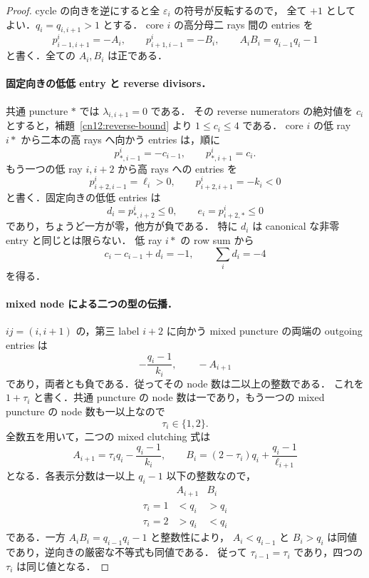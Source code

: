 \begin{proof}
cycle の向きを逆にすると全 $\varepsilon_i$ の符号が反転するので，
全て $+1$ としてよい．$q_i=q_{i,i+1}>1$ とする．
core $i$ の高分母二 rays 間の entries を
\[
 p^i_{i-1,i+1}=-A_i,\qquad
 p^i_{i+1,i-1}=-B_i,
 \qquad A_iB_i=q_{i-1}q_i-1
\]
と書く．全ての $A_i,B_i$ は正である．

\paragraph{固定向きの低低 entry と reverse divisors．}
共通 puncture $*$ では $\lambda_{i,i+1}=0$ である．
その reverse numerators の絶対値を $c_i$ とすると，補題~\ref{cn12:reverse-bound} より
$1\leq c_i\leq4$ である．
core $i$ の低 ray $i*$ から二本の高 rays へ向かう entries は，順に
\[
 p^i_{*,i-1}=-c_{i-1},\qquad p^i_{*,i+1}=c_i.
\]
もう一つの低 ray $i,i+2$ から高 rays への entries を
\[
 p^i_{i+2,i-1}=\ell_i>0,\qquad
 p^i_{i+2,i+1}=-k_i<0
\]
と書く．固定向きの低低 entries は
\[
 d_i=p^i_{*,i+2}\leq0,\qquad e_i=p^i_{i+2,*}\leq0
\]
であり，ちょうど一方が零，他方が負である．
特に $d_i$ は canonical な非零 entry と同じとは限らない．
低 ray $i*$ の row sum から
\begin{equation}\label{cq12:fixed-row}
 c_i-c_{i-1}+d_i=-1,
 \qquad \sum_i d_i=-4
\end{equation}
を得る．

\paragraph{mixed node による二つの型の伝播．}
$ij=(i,i+1)$ の，第三 label $i+2$ に向かう mixed puncture の両端の outgoing entries は
\[
 -\frac{q_i-1}{k_i},\qquad -A_{i+1}
\]
であり，両者とも負である．従ってその node 数は二以上の整数である．
これを $1+\tau_i$ と書く．共通 puncture の node 数は一であり，もう一つの mixed puncture の node 数も一以上なので
\[
 \tau_i\in\{1,2\}.
\]
全数五を用いて，二つの mixed clutching 式は
\begin{equation}\label{cq12:tau-equations}
 A_{i+1}=\tau_iq_i-\frac{q_i-1}{k_i},\qquad
 B_i=(2-\tau_i)q_i+\frac{q_i-1}{\ell_{i+1}}
\end{equation}
となる．各表示分数は一以上 $q_i-1$ 以下の整数なので，
\[
 \begin{array}{c|cc}
  & A_{i+1} & B_i\\ \hline
 \tau_i=1 & <q_i & >q_i\\
 \tau_i=2 & >q_i & <q_i
 \end{array}
\]
である．一方 $A_iB_i=q_{i-1}q_i-1$ と整数性により，
$A_i<q_{i-1}$ と $B_i>q_i$ は同値であり，逆向きの厳密な不等式も同値である．
従って $\tau_{i-1}=\tau_i$ であり，四つの $\tau_i$ は同じ値となる．


\end{proof}
